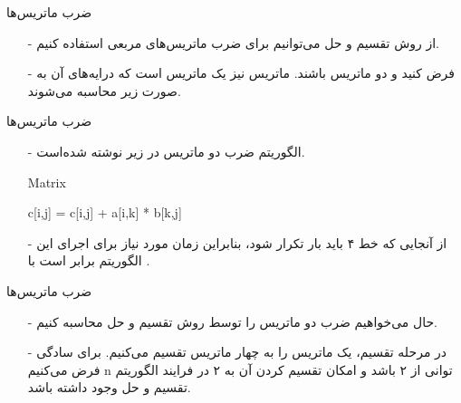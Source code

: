 
\begin{frame}{‌ضرب ماتریس‌ها}
\begin{itemize}\itemr
\item[-]
از روش تقسیم و حل می‌توانیم برای ضرب ماتریس‌های مربعی استفاده کنیم.
\item[-]
فرض کنید
و
دو ماتریس
باشند. ماتریس
نیز یک ماتریس
است که درایه‌های آن به صورت زیر محاسبه می‌شوند.
\begin{flushleft}
\end{flushleft}
\end{itemize}
\end{frame}


\begin{frame}{‌ضرب ماتریس‌ها}
\begin{itemize}\itemr
\item[-]
الگوریتم ضرب دو ماتریس در زیر نوشته شده‌است.
\begin{algorithm}[H]\alglr
  \caption{Matrix} 
  \begin{algorithmic}[1]
        
            
					\State c[i,j] = c[i,j] + a[i,k] * b[k,j] 
			    \EndFor
			\EndFor
	   \EndFor 
     \end{algorithmic}
  \label{alg:merge}
\end{algorithm}
\item[-]
از آنجایی که خط ۴ باید
بار تکرار شود، بنابراین زمان مورد نیاز برای اجرای این الگوریتم برابر است با
.
\end{itemize}
\end{frame}

\begin{frame}{‌ضرب ماتریس‌ها}
\begin{itemize}\itemr
\item[-]
حال می‌خواهیم ضرب دو ماتریس را توسط روش تقسیم و حل محاسبه کنیم.
\item[-]
در مرحله تقسیم، یک ماتریس
را به چهار ماتریس
تقسیم می‌کنیم. برای سادگی فرض می‌کنیم n توانی از ۲ باشد و امکان تقسیم کردن آن به ۲ در فرایند الگوریتم تقسیم و حل وجود داشته باشد.
\end{itemize}
\end{frame}


